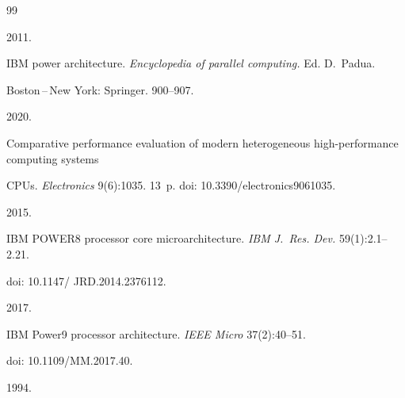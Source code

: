  










\renewcommand{\bibname}{\protect\rmfamily References}







{\small\frenchspacing


{%




\begin{thebibliography}{99}




 2011. 


IBM power architecture. \textit{Encyclopedia of parallel computing.} Ed. D.~Padua. 


Boston\,--\,New York: Springer. 900--907.




 2020.


Comparative performance evaluation of modern heterogeneous high-performance computing systems 


CPUs. \textit{Electronics} 9(6):1035. 13~p. doi: 10.3390\!/\!electronics9061035.




 2015. 


IBM POWER8 processor core microarchitecture. \textit{IBM J.~Res. Dev.} 59(1):2.1--2.21.


doi: 10.1147\!/ \!JRD.2014.2376112.




 2017. 


IBM Power9 processor architecture. \textit{IEEE Micro} 37(2):40--51.


doi: 10.1109\!/\!MM.2017.40.




 1994. 



\end{thebibliography}}}
